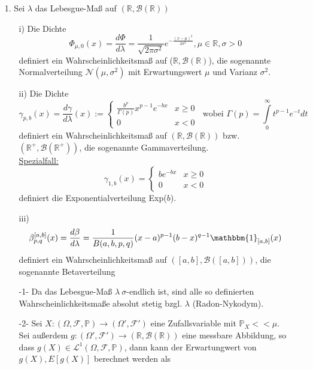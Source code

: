 \begin{ex}
\begin{itemize}
\item[]
\item[1.] Sei $ \lambda $ das Lebesgue-Maß auf $ (\mathbb R,\mathcal B(\mathbb R)) $
\begin{enumerate}
\item[i)] Die Dichte \[ \Phi_{\mu,0}(x)=\frac{d\Phi}{d\lambda}=\frac{1}{\sqrt{2\pi\sigma^{2}}}e^{-\frac{(x-\mu)^{2}}{2\sigma^{2}} },\mu\in\mathbb R,\sigma>0 \] definiert ein Wahrscheinlichkeitsmaß auf ($ \mathbb R,\mathcal B(\mathbb R) $), die sogenannte Normalverteilung $ \mathcal N(\mu,\sigma^{2}) $ mit Erwartungswert $ \mu $ und Varianz $ \sigma^{2} $.
\item[ii)] Die Dichte
\[ \gamma_{p,b}(x)=\frac{d\gamma}{d\lambda}(x):=\left\lbrace\begin{array}{lr} \frac{b^{p}}{\Gamma (p)}x^{p-1}e^{-bx} & x\geq 0 \\ 0 & x <0  \end{array}\right.  \ \text{ wobei } \Gamma(p)=\int\limits_{0}^{\infty}t^{p-1}e^{-t}dt  \]
definiert ein Wahrscheinlichkeitsmaß auf $ (\mathbb R,\mathcal B(\mathbb R)) $ bzw. $ (\mathbb R^{+},\mathcal B(\mathbb R^{+})) $, die sogenannte Gammaverteilung. \\
\underline{Spezialfall:} \[ \gamma_{1,b}(x)=\left\lbrace\begin{array}{lr} be^{-bx} & x\geq 0 \\ 0 & x <0  \end{array}\right.  \]
definiert die Exponentialverteilung Exp($ b $).
\item[iii)] \[ \beta_{p,q}^{[a,b]}(x)=\frac{d\beta}{d\lambda}=\frac{1}{B(a,b,p,q)}(x-a)^{p-1}(b-x)^{q-1}\mathbbm{1}_{[a,b]}(x) \]
definiert ein Wahrscheinlichkeitsmaß auf $ ([a,b],\mathcal B([a,b])) $, die sogenannte Betaverteilung
\end{enumerate}
\begin{rem}
\begin{enumerate}
\item[]
\item[-1-] Da das Lebesgue-Maß $ \lambda \ \sigma$-endlich ist, sind alle so definierten Wahrscheinlichkeitsmaße absolut stetig bzgl. $ \lambda $ (Radon-Nykodym).
\item[-2-] Sei $ X:(\Omega,\mathcal F,\mathbb P)\to(\Omega',\mathcal F') $ eine Zufallsvariable mit $ \mathbb{P}_{X}<<\mu $. Sei außerdem $ g:(\Omega',\mathcal F')\to(\mathbb R,\mathcal B(\mathbb R)) $ eine messbare Abbildung, so dass $ g(X)\in\mathcal L^{1}(\Omega,\mathcal F,\mathbb P) $, dann kann der Erwartungwert von $ g(X) , E[g(X)]$ berechnet werden als

\end{enumerate}
\end{rem}
\end{itemize}
\end{ex}

